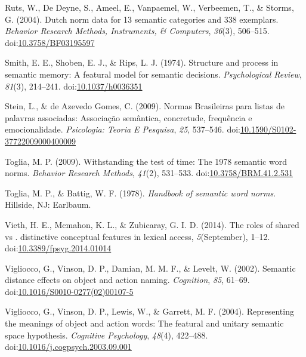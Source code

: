 \documentclass[english,,man]{apa6}
\theoremstyle{definition}
\theoremstyle{definition}
\theoremstyle{definition}
\theoremstyle{remark}
\begin{document}
\leavevmode\hypertarget{ref-Ruts2004}{}%
Ruts, W., De Deyne, S., Ameel, E., Vanpaemel, W., Verbeemen, T., \&
Storms, G. (2004). Dutch norm data for 13 semantic categories and 338
exemplars. \emph{Behavior Research Methods, Instruments, \& Computers},
\emph{36}(3), 506--515.
doi:\href{https://doi.org/10.3758/BF03195597}{10.3758/BF03195597}

\leavevmode\hypertarget{ref-Smith1974}{}%
Smith, E. E., Shoben, E. J., \& Rips, L. J. (1974). Structure and
process in semantic memory: A featural model for semantic decisions.
\emph{Psychological Review}, \emph{81}(3), 214--241.
doi:\href{https://doi.org/10.1037/h0036351}{10.1037/h0036351}

\leavevmode\hypertarget{ref-Stein2009}{}%
Stein, L., \& de Azevedo Gomes, C. (2009). Normas Brasileiras para
listas de palavras associadas: Associação semântica, concretude,
frequência e emocionalidade. \emph{Psicologia: Teoria E Pesquisa},
\emph{25}, 537--546.
doi:\href{https://doi.org/10.1590/S0102-37722009000400009}{10.1590/S0102-37722009000400009}

\leavevmode\hypertarget{ref-Toglia2009}{}%
Toglia, M. P. (2009). Withstanding the test of time: The 1978 semantic
word norms. \emph{Behavior Research Methods}, \emph{41}(2), 531--533.
doi:\href{https://doi.org/10.3758/BRM.41.2.531}{10.3758/BRM.41.2.531}

\leavevmode\hypertarget{ref-Toglia1978}{}%
Toglia, M. P., \& Battig, W. F. (1978). \emph{Handbook of semantic word
norms}. Hillside, NJ: Earlbaum.

\leavevmode\hypertarget{ref-Vieth2014}{}%
Vieth, H. E., Mcmahon, K. L., \& Zubicaray, G. I. D. (2014). The roles
of shared vs . distinctive conceptual features in lexical access,
\emph{5}(September), 1--12.
doi:\href{https://doi.org/10.3389/fpsyg.2014.01014}{10.3389/fpsyg.2014.01014}

\leavevmode\hypertarget{ref-Vigliocco2002}{}%
Vigliocco, G., Vinson, D. P., Damian, M. M. F., \& Levelt, W. (2002).
Semantic distance effects on object and action naming. \emph{Cognition},
\emph{85}, 61--69.
doi:\href{https://doi.org/10.1016/S0010-0277(02)00107-5}{10.1016/S0010-0277(02)00107-5}

\leavevmode\hypertarget{ref-Vigliocco2004}{}%
Vigliocco, G., Vinson, D. P., Lewis, W., \& Garrett, M. F. (2004).
Representing the meanings of object and action words: The featural and
unitary semantic space hypothesis. \emph{Cognitive Psychology},
\emph{48}(4), 422--488.
doi:\href{https://doi.org/10.1016/j.cogpsych.2003.09.001}{10.1016/j.cogpsych.2003.09.001}
\end{document}
